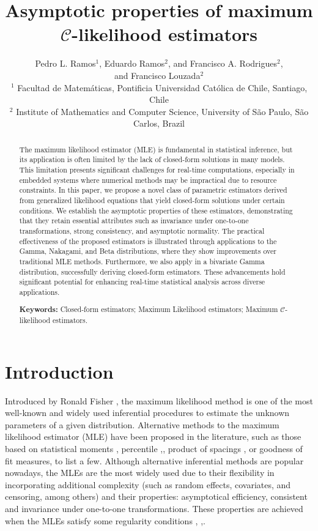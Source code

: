 \documentclass[10pt,a4paper,onecolumn]{article} %
\title{Asymptotic properties of maximum $\mathcal{C}$-likelihood estimators}
\author{
Pedro L. Ramos$^1$, Eduardo Ramos$^2$, and Francisco A. Rodrigues$^2$, \\ and Francisco Louzada$^2$ \\  
\normalsize{$^{1}$ Facultad de Matemáticas, Pontificia Universidad Católica de Chile, Santiago, Chile} \\  
\normalsize{$^{2}$ Institute of Mathematics and Computer Science, University of S\~ao Paulo, S\~ao Carlos, Brazil}
}
\begin{document}
\maketitle

\begin{abstract}

The maximum likelihood estimator (MLE) is fundamental in statistical inference, but its application is often limited by the lack of closed-form solutions in many models. This limitation presents significant challenges for real-time computations, especially in embedded systems where numerical methods may be impractical due to resource constraints. In this paper, we propose a novel class of parametric estimators derived from generalized likelihood equations that yield closed-form solutions under certain conditions. We establish the asymptotic properties of these estimators, demonstrating that they retain essential attributes such as invariance under one-to-one transformations, strong consistency, and asymptotic normality. The practical effectiveness of the proposed estimators is illustrated through applications to the Gamma, Nakagami, and Beta distributions, where they show improvements over traditional MLE methods. Furthermore, we also apply in a bivariate Gamma distribution, successfully deriving closed-form estimators. These advancements hold significant potential for enhancing real-time statistical analysis across diverse applications.

\noindent \textbf{Keywords:} Closed-form estimators; Maximum Likelihood estimators; Maximum $\mathcal{C}$-likelihood estimators.
\end{abstract}




\section{Introduction}


Introduced by Ronald Fisher \cite{aldrich1997ra}, the maximum likelihood method is one of the most well-known and widely used inferential procedures to estimate the unknown parameters of a given distribution. 
Alternative methods to the maximum likelihood estimator (MLE) have been proposed in the literature, such as those based on statistical moments \cite{hosking1990moments}, percentile \cite{kao1},\cite{kao2}, product of spacings \cite{Cheng2}, or goodness of fit measures, to list a few. Although alternative inferential methods are popular nowadays, the MLEs are the most widely used due to their flexibility in incorporating additional complexity (such as random effects, covariates, and censoring, among others) and their properties: asymptotical efficiency, consistent and invariance under one-to-one transformations. These properties are achieved when the MLEs satisfy some regularity conditions  \cite{2004-Bierens}, \cite{2006-Lehmann},\cite{redner1981note}.
\end{document}
